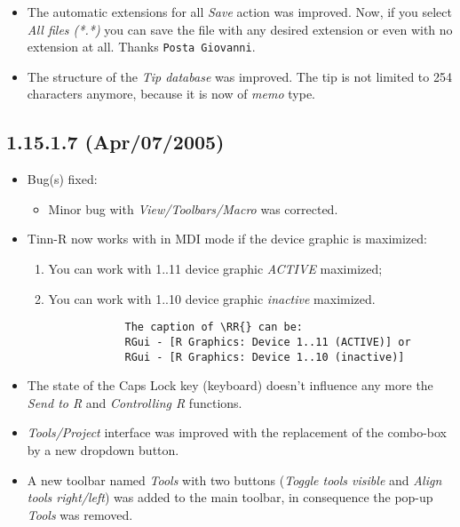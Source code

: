 \begin{itemize}
  \item The automatic extensions for all \textit{Save} action was
    improved. Now, if you select \textit{All files (*.*)} you can
    save the file with any desired extension or even with no
    extension at all. Thanks \texttt{Posta Giovanni}.
  \item The structure of the \textit{Tip database} was improved.
    The tip is not limited to 254 characters anymore, because it is
    now of \textit{memo} type.
\end{itemize}


\subsection{1.15.1.7 (Apr/07/2005)}

\begin{itemize}
  \item Bug(s) fixed:
    \begin{itemize}
      \item Minor bug with \textit{View/Toolbars/Macro} was corrected.
    \end{itemize}
  \item Tinn-R now works with \RR{} in MDI mode if the device graphic is maximized:
    \begin{enumerate}
      \item You can work with 1..11 device graphic \textit{ACTIVE} maximized;
      \item You can work with 1..10 device graphic \textit{inactive} maximized.
        \begin{footnotesize}
          \begin{verbatim}
            The caption of \RR{} can be:
            RGui - [R Graphics: Device 1..11 (ACTIVE)] or
            RGui - [R Graphics: Device 1..10 (inactive)]
          \end{verbatim}
        \end{footnotesize}
    \end{enumerate}
  \item The state of the Caps Lock key (keyboard) doesn't influence any more the \textit{Send to R} and
    \textit{Controlling R} functions.
  \item \textit{Tools/Project} interface was improved with the replacement of the combo-box by a new dropdown button.
  \item A new toolbar named \textit{Tools} with two buttons (\textit{Toggle tools visible} and
    \textit{Align tools right/left}) was added to the main toolbar, in consequence the pop-up \textit{Tools} was removed.

\end{itemize}
